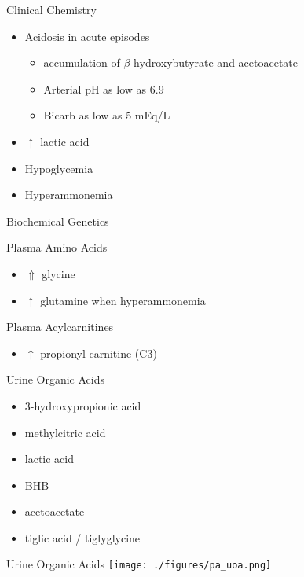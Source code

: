 \documentclass[presentation, smaller]{beamer}
\begin{document}
\begin{frame}[label={sec:orgheadline15}]{Clinical Chemistry}
\begin{itemize}
\item Acidosis in acute episodes
\begin{itemize}
\item accumulation of \(\beta\)-hydroxybutyrate and acetoacetate
\item Arterial pH as low as 6.9
\item Bicarb as low as 5 mEq/L
\end{itemize}
\item \(\uparrow\) lactic acid
\item Hypoglycemia
\item Hyperammonemia
\end{itemize}
\end{frame}

\begin{frame}[label={sec:orgheadline16}]{Biochemical Genetics}
\begin{block}{Plasma Amino Acids}
\begin{itemize}
\item \(\Uparrow\) glycine
\item \(\uparrow\) glutamine when hyperammonemia
\end{itemize}
\end{block}
\begin{block}{Plasma Acylcarnitines}
\begin{itemize}
\item \(\uparrow\) propionyl carnitine (C3)
\end{itemize}
\end{block}
\begin{block}{Urine Organic Acids}
\begin{itemize}
\item 3-hydroxypropionic acid
\item methylcitric acid
\item lactic acid
\item BHB
\item acetoacetate
\item tiglic acid / tiglyglycine
\end{itemize}
\end{block}
\end{frame}

\begin{frame}[label={sec:orgheadline17}]{Urine Organic Acids}
\texttt{[image: ./figures/pa\_uoa.png]}
\end{frame}
\end{document}
